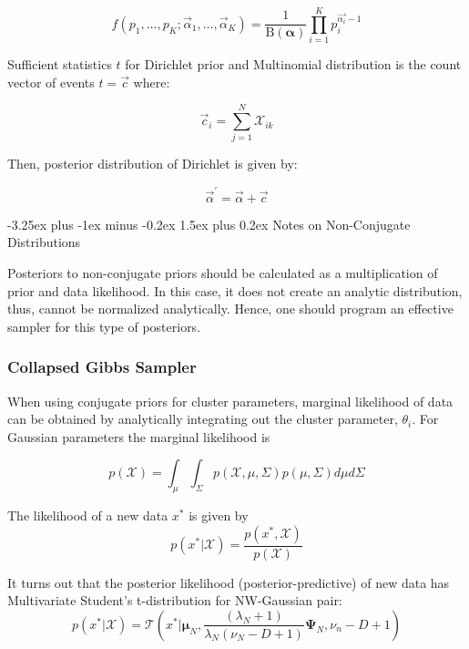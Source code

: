 \documentclass[12pt, a4paper]{article}
\makeatletter
\renewcommand{\paragraph}{\@startsection{paragraph}{4}{0ex}%
    {-3.25ex plus -1ex minus -0.2ex}%
    {1.5ex plus 0.2ex}%
    {\normalfont\normalsize\bfseries}}
\makeatother
\begin{document}
\begin{equation}
f(p_{1},\ldots ,p_{K};\vec{\alpha}_{1},\ldots ,\vec{\alpha}_{K})=\frac {1}{\mathrm {B} ({\boldsymbol {\alpha }})} \prod _{i=1}^{K}p_{i}^{\vec{\alpha_{i}}-1}
\end{equation}

Sufficient statistics $t$ for Dirichlet prior and Multinomial distribution is the count vector of events $t=\vec{c}$ where:

$$\vec{c}_i = \sum_{j=1}^N{\mathcal{X}_{ik}}$$

Then, posterior distribution of Dirichlet is given by:

$$\vec{\alpha}^\prime  = \vec{\alpha}+ \vec{c}$$

\paragraph{Notes on Non-Conjugate Distributions}

Posteriors to non-conjugate priors should be calculated as a multiplication of prior and data likelihood. In this case, it does not create an analytic distribution, thus, cannot be normalized analytically. Hence, one should program an effective sampler for this type of posteriors. 



\subsubsection{Collapsed Gibbs Sampler}

When using conjugate priors for cluster parameters, marginal likelihood
of data can be obtained by analytically integrating out the cluster
parameter, \(\theta_i\). For Gaussian parameters the marginal
likelihood is

\begin{equation*}
p(\mathcal{X}) = \int_\mu\int_\Sigma p(\mathcal{X},\mu,\Sigma)p(\mu,\Sigma)d\mu d\Sigma
\end{equation*}

The likelihood of a new data \(x^*\) is given by
\begin{equation*}
p(x^* | \mathcal{X}) = \frac{p(x^*,\mathcal{X})}{p(\mathcal{X})}
\end{equation*}

It turns out that the posterior likelihood (posterior-predictive) of new data has Multivariate Student's t-distribution \cite{kamper2013gibbs} for NW-Gaussian pair:
\begin{equation*}
    p(x^*|\mathcal{X}) = \mathcal{T}(x^*|\boldsymbol \mu_N,\frac{(\lambda_N+1)}{\lambda_N(\nu_N-D+1)} \boldsymbol\Psi_N,\nu_n-D+1)
\end{equation*}
\end{document}
